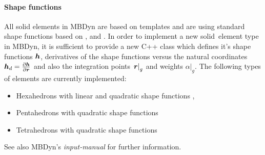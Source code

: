 \paragraph{Shape functions}
All solid elements in MBDyn are based on templates and are using standard shape functions based on \cite{BATHE2016}, \cite{DHONDT2004} and \cite{CODEASTERR30301}.
In order to implement a new solid~element type in MBDyn, it is sufficient to provide a new C++ class which defines it's shape functions $\bm{h}$,
derivatives of the shape functions versus the natural coordinates $\bm{h}_d=\frac{\partial \bm{h}}{\partial \bm{r}}$ and also the integration points $\left.\bm{r}\right\vert_g$ and weights $\left.\alpha\right\vert_g$.
The following types of elements are currently implemented:
\begin{itemize}
\item Hexahedrons with linear and quadratic shape functions \cite{BATHE2016}, \cite{DHONDT2004}
\item Pentahedrons with quadratic shape functions \cite{CODEASTERR30301}
\item Tetrahedrons with quadratic shape functions \cite{CODEASTERR30301}
\end{itemize}
See also MBDyn's \emph{input-manual} for further information.

